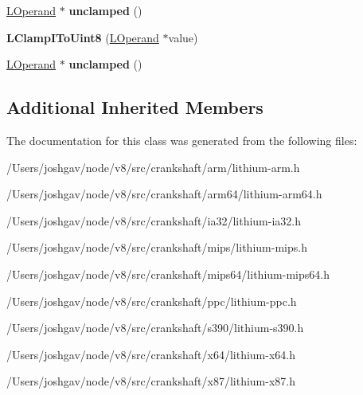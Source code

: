 \begin{DoxyCompactItemize}
\item 
\hyperlink{classv8_1_1internal_1_1_l_operand}{L\+Operand} $\ast$ {\bfseries unclamped} ()\hypertarget{classv8_1_1internal_1_1_l_clamp_i_to_uint8_a46f99732cc00f77e711f6d13cb3eaa8b}{}\label{classv8_1_1internal_1_1_l_clamp_i_to_uint8_a46f99732cc00f77e711f6d13cb3eaa8b}

\item 
{\bfseries L\+Clamp\+I\+To\+Uint8} (\hyperlink{classv8_1_1internal_1_1_l_operand}{L\+Operand} $\ast$value)\hypertarget{classv8_1_1internal_1_1_l_clamp_i_to_uint8_a6092c9e082ee9adc6c06a4cb47b45ede}{}\label{classv8_1_1internal_1_1_l_clamp_i_to_uint8_a6092c9e082ee9adc6c06a4cb47b45ede}

\item 
\hyperlink{classv8_1_1internal_1_1_l_operand}{L\+Operand} $\ast$ {\bfseries unclamped} ()\hypertarget{classv8_1_1internal_1_1_l_clamp_i_to_uint8_a46f99732cc00f77e711f6d13cb3eaa8b}{}\label{classv8_1_1internal_1_1_l_clamp_i_to_uint8_a46f99732cc00f77e711f6d13cb3eaa8b}

\end{DoxyCompactItemize}
\subsection*{Additional Inherited Members}


The documentation for this class was generated from the following files\+:\begin{DoxyCompactItemize}
\item 
/\+Users/joshgav/node/v8/src/crankshaft/arm/lithium-\/arm.\+h\item 
/\+Users/joshgav/node/v8/src/crankshaft/arm64/lithium-\/arm64.\+h\item 
/\+Users/joshgav/node/v8/src/crankshaft/ia32/lithium-\/ia32.\+h\item 
/\+Users/joshgav/node/v8/src/crankshaft/mips/lithium-\/mips.\+h\item 
/\+Users/joshgav/node/v8/src/crankshaft/mips64/lithium-\/mips64.\+h\item 
/\+Users/joshgav/node/v8/src/crankshaft/ppc/lithium-\/ppc.\+h\item 
/\+Users/joshgav/node/v8/src/crankshaft/s390/lithium-\/s390.\+h\item 
/\+Users/joshgav/node/v8/src/crankshaft/x64/lithium-\/x64.\+h\item 
/\+Users/joshgav/node/v8/src/crankshaft/x87/lithium-\/x87.\+h\end{DoxyCompactItemize}
